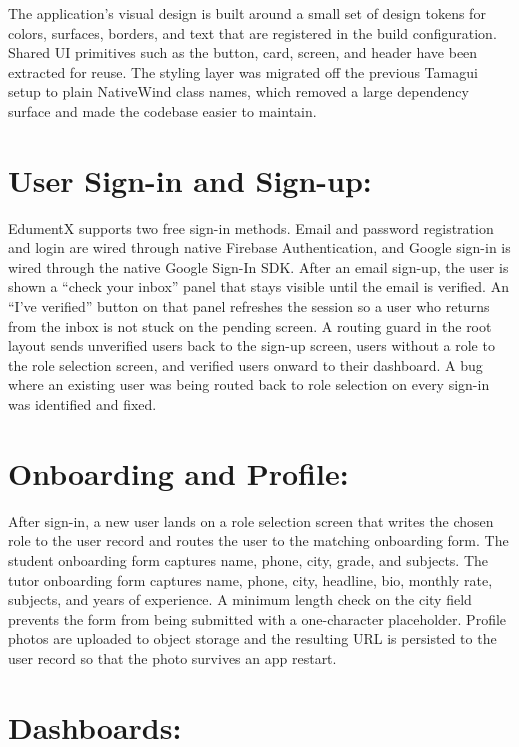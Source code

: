\documentclass[12pt]{report}
\begin{document}
The application's visual design is built around a small set
of design tokens for colors, surfaces, borders, and text
that are registered in the build configuration. Shared UI
primitives such as the button, card, screen, and header
have been extracted for reuse. The styling layer was
migrated off the previous Tamagui setup to plain NativeWind
class names, which removed a large dependency surface and
made the codebase easier to maintain.

\section{User Sign-in and Sign-up:}

EdumentX supports two free sign-in methods. Email and
password registration and login are wired through native
Firebase Authentication, and Google sign-in is wired through
the native Google Sign-In SDK. After an email sign-up, the
user is shown a ``check your inbox'' panel that stays
visible until the email is verified. An ``I've verified''
button on that panel refreshes the session so a user who
returns from the inbox is not stuck on the pending screen.
A routing guard in the root layout sends unverified users
back to the sign-up screen, users without a role to the
role selection screen, and verified users onward to their
dashboard. A bug where an existing user was being routed
back to role selection on every sign-in was identified and
fixed.

\section{Onboarding and Profile:}

After sign-in, a new user lands on a role selection screen
that writes the chosen role to the user record and routes
the user to the matching onboarding form. The student
onboarding form captures name, phone, city, grade, and
subjects. The tutor onboarding form captures name, phone,
city, headline, bio, monthly rate, subjects, and years of
experience. A minimum length check on the city field
prevents the form from being submitted with a one-character
placeholder. Profile photos are uploaded to object storage
and the resulting URL is persisted to the user record so
that the photo survives an app restart.

\section{Dashboards:}
\end{document}
